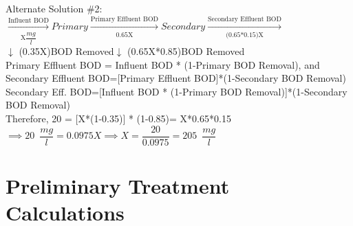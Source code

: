 \begin{enumerate}
Alternate Solution \#2:\\
\vspace{0.3cm}
$\xrightarrow[\text{X}\dfrac{mg}{l}]{\text{Influent BOD}}\boxed{Primary}\xrightarrow[\text{0.65X}]{\text{Primary Effluent BOD}}\boxed{Secondary}\xrightarrow[\text{(0.65*0.15)X}]{\text{Secondary Effluent BOD}}$\\
\hspace{2.8cm}$\downarrow$ {\tiny(0.35X)BOD Removed}\hspace{2.2cm}$\downarrow$ {\tiny(0.65X*0.85)BOD Removed}\\
\vspace{0.3cm}
Primary Effluent BOD = Influent BOD * (1-Primary BOD Removal), and\\
Secondary Effluent BOD=[Primary Effluent BOD]*(1-Secondary BOD Removal)\\
Secondary Eff. BOD=[Influent BOD * (1-Primary BOD Removal)]*(1-Secondary BOD Removal)\\

Therefore, 20 = [X*(1-0.35)] * (1-0.85)= X*0.65*0.15\\
$\implies 20 \enspace \dfrac{mg}{l}= 0.0975X \implies X=\dfrac{20}{0.0975}=\boxed{205 \enspace \dfrac{mg}{l}}$\\

\end{enumerate}



\section{Preliminary Treatment Calculations}


